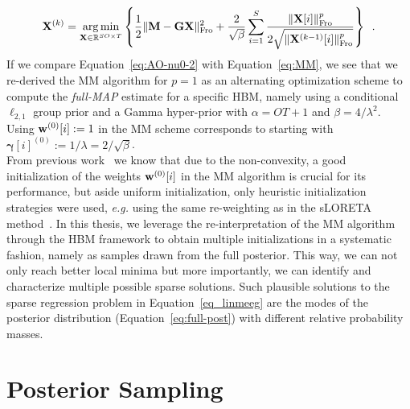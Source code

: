 \begin{equation} \label{eq:AO-nu0-2}
\mathbf{X}^{(k)} = \mathop{\mathrm{arg}\,\mathrm{min}}_{\mathbf{X}\in\mathbb{R}^{SO \times T}} \left\lbrace \frac{1}{2} \|{\mathbf{M} -\mathbf{G} \mathbf{X}}\|_{\rm Fro}^2 + \frac{2}{\sqrt{\beta}} \sum_{i=1}^S  \frac{\|{\mathbf{X}[i]}\|_{\rm Fro}^p}{2 \sqrt{\|{\mathbf{X}^{(k-1)}[i]}\|_{\rm Fro}^p}} \right\rbrace \enspace .
\end{equation}
If we compare Equation~\eqref{eq:AO-nu0-2} with Equation~\eqref{eq:MM}, we see that we re-derived the MM algorithm for $p=1$ as an alternating optimization scheme to compute the \emph{full-MAP} estimate for a specific HBM, namely using a conditional $\ell_{2,1}$ group prior and a Gamma hyper-prior with $\alpha = OT + 1$ and $\beta = 4/\lambda^2$. Using $\mathbf{w}^{(0)}[i] := 1$ in the MM scheme corresponds to starting with $\mathbf{\gamma}[i]^{(0)} := 1/\lambda =  2/\sqrt{\beta}$.\\

From previous work~\cite{strohmeier-etal:16} we know that due to the non-convexity, a good initialization of the weights $\mathbf{w}^{(0)}[i]$ in the MM algorithm is crucial for its performance, but aside uniform initialization, only heuristic initialization strategies were used, \textit{e.g.} using the same re-weighting as in the sLORETA method~\cite{Pa02}. In this thesis, we leverage the re-interpretation of the MM algorithm through the HBM framework to obtain multiple initializations in a systematic fashion, namely as samples drawn from the full posterior. This way, we can not only reach better local minima but more importantly, we can identify and characterize multiple possible sparse solutions. Such plausible solutions to the sparse regression problem in Equation~\eqref{eq_linmeeg} are the modes of the posterior distribution (Equation~\eqref{eq:full-post}) with different relative probability masses.

\section{Posterior Sampling}
\label{section:hbm_sampling}

